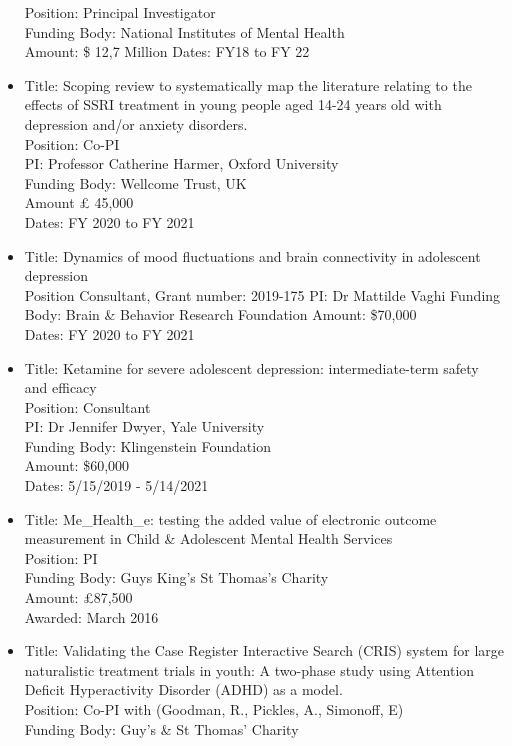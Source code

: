 \documentclass[
]{article}
\begin{document}
\begin{itemize}
  Position: Principal Investigator\\
  Funding Body: National Institutes of Mental Health\\
  Amount: \$ 12,7 Million Dates: FY18 to FY 22
\item
  Title: Scoping review to systematically map the literature relating to
  the effects of SSRI treatment in young people aged 14-24 years old
  with depression and/or anxiety disorders.\\
  Position: Co-PI\\
  PI: Professor Catherine Harmer, Oxford University\\
  Funding Body: Wellcome Trust, UK\\
  Amount £ 45,000\\
  Dates: FY 2020 to FY 2021
\item
  Title: Dynamics of mood fluctuations and brain connectivity in
  adolescent depression\\
  Position Consultant, Grant number: 2019-175 PI: Dr Mattilde Vaghi
  Funding Body: Brain \& Behavior Research Foundation Amount: \$70,000\\
  Dates: FY 2020 to FY 2021
\item
  Title: Ketamine for severe adolescent depression: intermediate-term
  safety and efficacy\\
  Position: Consultant\\
  PI: Dr Jennifer Dwyer, Yale University\\
  Funding Body: Klingenstein Foundation\\
  Amount: \$60,000\\
  Dates: 5/15/2019 - 5/14/2021
\item
  Title: Me\_Health\_e: testing the added value of electronic outcome
  measurement in Child \& Adolescent Mental Health Services\\
  Position: PI\\
  Funding Body: Guys King's St Thomas's Charity\\
  Amount: £87,500\\
  Awarded: March 2016
\item
  Title: Validating the Case Register Interactive Search (CRIS) system
  for large naturalistic treatment trials in youth: A two-phase study
  using Attention Deficit Hyperactivity Disorder (ADHD) as a model.\\
  Position: Co-PI with (Goodman, R., Pickles, A., Simonoff, E)\\
  Funding Body: Guy's \& St Thomas' Charity\\

\end{itemize}
\end{document}
